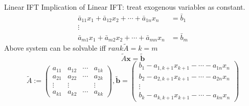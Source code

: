 \documentclass[a4paper,11pt]{article}
\begin{document}
\begin{frame}[t]{Linear IFT}
	Implication of Linear IFT: treat exogenous variables as constant. 
	\begin{align*}
		\bar a_{11} x_1 + \bar a_{12}x_2 + \cdots + \bar a_{1n}x_n &= \bar b_1\\
		\vdots\\
		\bar a_{m1} x_1 + \bar a_{m2}x_2 + \cdots + \bar a_{mn}x_n &= \bar b_m
	\end{align*}
	Above system can be solvable iff $rank \tilde{A} = k = m$
	\[
		\tilde{A}\mathbf{x} = \tilde{\mathbf{b}}
	\]
	\[
		\tilde{A}:= \begin{pmatrix}
			a_{11}&a_{12}&\cdots&a_{1k}\\
			a_{21}&a_{22}&\cdots&a_{2k}\\
			\vdots&\vdots&&\vdots\\
			a_{k1}&a_{k2}&\cdots&a_{kk}
		\end{pmatrix}, \tilde{\mathbf{b}}=\begin{pmatrix}
			b_1 - a_{1,k+1}x_{k+1} - \cdots - a_{1n}x_n\\
			b_2 - a_{2,k+1}x_{k+1} - \cdots - a_{2n}x_n\\
			\vdots\\
			b_k - a_{k,k+1}x_{k+1} - \cdots - a_{kn}x_n
		\end{pmatrix}
	\]
\end{frame}
\end{document}
